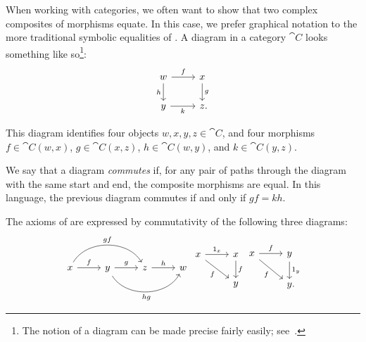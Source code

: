 

\noindent
When working with categories, we often want to show that two complex composites
of morphisms equate. In this case, we prefer graphical notation to the more
traditional symbolic equalities of
. A diagram in a category
$\cat{C}$ looks something like so\footnote{
  The notion of a diagram can be made precise fairly easily; see~\cite[subsection 1.6]{riehl-2017}.
}:
\[
  \begin{tikzcd}
    w\ar[r, "f"]\ar[d, "h"'] & x\ar[d, "g"] \\
    y\ar[r, "k"'] & z\punctuation{.}
  \end{tikzcd}
\]

This diagram identifies four objects $w,x,y,z\in\cat{C}$, and four morphisms
$f\in\cat{C}(w, x)$, $g\in\cat{C}(x, z)$, $h\in\cat{C}(w, y)$, and
$k\in\cat{C}(y, z)$.

We say that a diagram \emph{commutes} if, for any pair of paths
through the diagram with the same start and end, the composite morphisms are
equal. In this language, the previous diagram commutes if and only if $gf = kh$.

\begin{ex}
	The axioms of  are expressed by commutativity of the
	following three diagrams:
  \[
		\begin{tikzcd}
			x\ar[r, "f"]\ar[rr, "gf", bend left=60] &
			y\ar[r, "g"]\ar[rr, "hg"', bend right=60] &
			z\ar[r, "h"] & w
		\end{tikzcd}
		\begin{tikzcd}
			x\ar[r, "1_x"]\ar[rd, "f"'] & x\ar[d, "f"] \\
			& y
		\end{tikzcd}
		\begin{tikzcd}
			x\ar[r, "f"]\ar[rd, "f"'] & y\ar[d, "1_y"] \\
			& y\punctuation{.}
		\end{tikzcd}
  \]
\end{ex}

